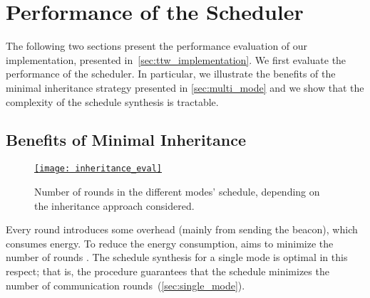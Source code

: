 
\section{Performance of the \TTW Scheduler}
\label{sec:ttw_evaluation_sched}

The following two sections present the performance evaluation of our \TTW implementation, presented in~\cref{sec:ttw_implementation}.
We first evaluate the performance of the scheduler. In particular, we illustrate the benefits of the minimal inheritance strategy presented in \cref{sec:multi_mode} and we show that the complexity of the schedule synthesis is tractable.

\subsection{Benefits of Minimal Inheritance}

\begin{figure}
  \centering
  \href{\ttwfig{Figure-11}}{%
  \texttt{[image: inheritance\_eval]}}
  \caption{Number of rounds in the different modes' schedule, depending on the inheritance approach considered.
  }
  \label{fig:inheritance_eval}
\end{figure}

Every round introduces some overhead (mainly from  sending the beacon), which consumes energy.
To reduce the energy consumption, \TTW aims to minimize the number of rounds .
The schedule synthesis for a single mode is optimal in this respect; that is, the procedure guarantees that the schedule minimizes the number of communication rounds~(\cref{sec:single_mode}).

\squarepar{%
  The second objective of the scheduler is to allow persistent applications to keep the same schedule in different operation modes \objective{2}.
  This creates additional constraints that break the optimality guarantee: in other words, the schedule of mode \modej, when constrained to be compatible with mode \modei, may contain more rounds than required to schedule the mode \modej alone.
  A naive solution to meet \objective{2} is to completely ``reserve the space'' of previously scheduled modes. This is equivalent to consider that all applications executing in mode \modei are also executing in \modej, even if it is not actually the case. We call this the \emph{full inheritance} approach.
  This approach does guarantee compatibility but it is very pessimistic: it leads to an excessive increase of the number of rounds and find problems to be non-schedulable when they may in fact be feasible.%
}


